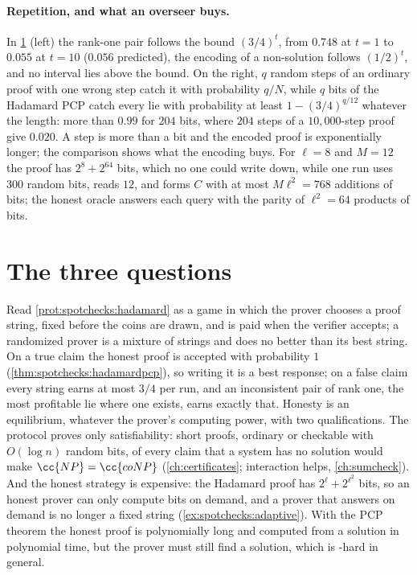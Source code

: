 \begin{refsection}
\begin{figure}[t]
\label{fig:spotchecks:pcp}
\end{figure}

\paragraph{Repetition, and what an overseer buys.} In \cref{fig:spotchecks:pcp} (left) the rank-one pair follows the bound $(3/4)^t$, from $0.748$ at $t=1$ to $0.055$ at $t=10$ ($0.056$ predicted), the encoding of a non-solution follows $(1/2)^t$, and no interval lies above the bound. On the right, $q$ random steps of an ordinary proof with one wrong step catch it with probability $q/N$, while $q$ bits of the Hadamard PCP catch every lie with probability at least $1-(3/4)^{q/12}$ whatever the length: more than $0.99$ for $204$ bits, where $204$ steps of a $10{,}000$-step proof give $0.020$. A step is more than a bit and the encoded proof is exponentially longer; the comparison shows what the encoding buys. For $\ell=8$ and $M=12$ the proof has $2^8+2^{64}$ bits, which no one could write down, while one run uses $300$ random bits, reads $12$, and forms $C$ with at most $M\ell^2=768$ additions of bits; the honest oracle answers each query with the parity of $\ell^2=64$ products of bits.

\section{The three questions}\label{sec:spotchecks:questions}

\questionone Read \cref{prot:spotchecks:hadamard} as a game in which the prover chooses a proof string, fixed before the coins are drawn, and is paid when the verifier accepts; a randomized prover is a mixture of strings and does no better than its best string. On a true claim the honest proof is accepted with probability $1$ (\cref{thm:spotchecks:hadamardpcp}), so writing it is a best response; on a false claim every string earns at most $3/4$ per run, and an inconsistent pair of rank one, the most profitable lie where one exists, earns exactly that. Honesty is an equilibrium, whatever the prover's computing power, with two qualifications. The protocol proves only satisfiability: short proofs, ordinary or checkable with $O(\log n)$ random bits, of every claim that a system has no solution would make $\cc{NP}=\cc{coNP}$ (\cref{ch:certificates}; interaction helps, \cref{ch:sumcheck}). And the honest strategy is expensive: the Hadamard proof has $2^\ell+2^{\ell^2}$ bits, so an honest prover can only compute bits on demand, and a prover that answers on demand is no longer a fixed string (\cref{ex:spotchecks:adaptive}). With the PCP theorem the honest proof is polynomially long and computed from a solution in polynomial time, but the prover must still find a solution, which is -hard in general.


\end{refsection}
